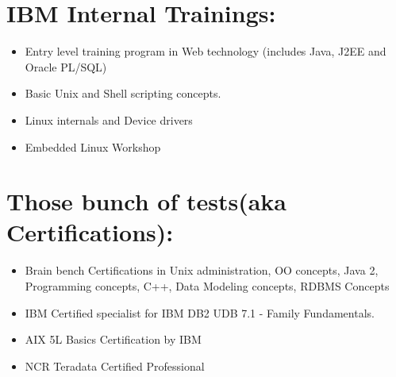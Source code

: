\section {IBM Internal Trainings:}
	\begin {itemize}

		\item Entry level training program in Web technology (includes Java, J2EE and Oracle PL/SQL)

		\item Basic Unix and Shell scripting concepts.

		\item Linux internals and Device drivers
		\item Embedded Linux Workshop
	\end {itemize}

\section {Those bunch of tests(aka Certifications):}
	\begin {itemize}

		\item Brain bench Certifications in Unix administration, OO concepts, Java 2, Programming concepts, C++, Data Modeling concepts, RDBMS Concepts

		\item IBM Certified specialist for IBM DB2 UDB 7.1 - Family Fundamentals.

		\item AIX 5L Basics Certification by IBM

		\item NCR Teradata Certified Professional
	\end {itemize}

